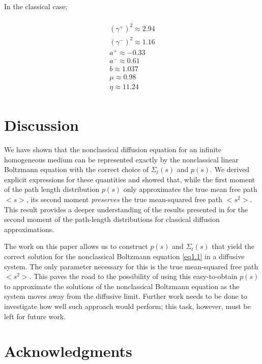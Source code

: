 \documentclass[preprint,12pt]{elsarticle}
\newcommand{\bl}{\big<}
\newcommand{\bg}{\big>}
\begin{document}
In the classical case;

\begin{multline}
\\
(\gamma^+)^2 \approx 2.94 \\
(\gamma^-)^2 \approx 1.16 \\
a^+ \approx -0.33 \\
a^- \approx 0.61 \\
b \approx 1.037 \\
\mu \approx 0.98\\
\eta \approx 11.24 \\
\end{multline}

\section{Discussion}\label{sec6}
\setcounter{section}{4}


\setcounter{equation}{0} 

We have shown that the nonclassical diffusion equation for an infinite homogeneous medium can be represented exactly by the nonclassical linear Boltzmann equation with the correct choice of $\Sigma_t(s)$ and $p(s)$. We derived explicit expressions for these quantities and showed that, while the first moment of the path length distribution $p(s)$ only approximates the true mean free path $\bl s\bg$, its second moment \textit{preserves} the true mean-squared free path $\bl s^2\bg$. This result provides a deeper understanding of the results presented in \cite{siap15} for the second moment of the path-length distributions for classical diffusion approximations.

The work on this paper allows us to construct $p(s)$ and $\Sigma_t(s)$ that yield the correct solution for the nonclassical Boltzmann equation \eqref{eq1.1} in a diffusive system. The only parameter necessary for this is the true mean-squared free path $\bl s^2\bg$. This paves the road to the possibility of using this easy-to-obtain $p(s)$ to approximate the solutions of the nonclassical Boltzmann equation as the system moves away from the diffusive limit. Further work needs to be done to investigate how well such approach would perform; this task, however, must be left for future work.   

\section*{Acknowledgments}
\end{document}
